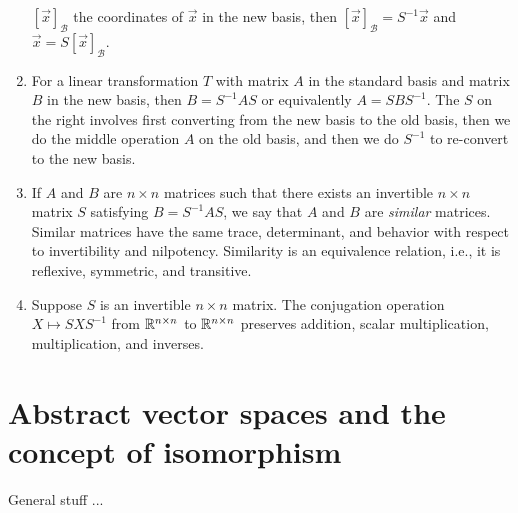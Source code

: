 \documentclass[10pt]{amsart}
\begin{document}
\begin{enumerate}
  $[\vec{x}]_{\mathcal{B}}$ the coordinates of $\vec{x}$ in the new
  basis, then $[\vec{x}]_{\mathcal{B}} = S^{-1}\vec{x}$ and $\vec{x} =
  S[\vec{x}]_{\mathcal{B}}$.
\item For a linear transformation $T$ with matrix $A$ in the standard
  basis and matrix $B$ in the new basis, then $B = S^{-1}AS$ or
  equivalently $A = SBS^{-1}$. The $S$ on the right involves first
  converting from the new basis to the old basis, then we do the
  middle operation $A$ on the old basis, and then we do $S^{-1}$ to
  re-convert to the new basis.
\item If $A$ and $B$ are $n \times n$ matrices such that there exists
  an invertible $n \times n$ matrix $S$ satisfying $B = S^{-1}AS$, we
  say that $A$ and $B$ are {\em similar} matrices. Similar matrices
  have the same trace, determinant, and behavior with respect to
  invertibility and nilpotency. Similarity is an equivalence relation,
  i.e., it is reflexive, symmetric, and transitive.
\item Suppose $S$ is an invertible $n \times n$ matrix. The
  conjugation operation $X \mapsto SXS^{-1}$ from $\mathbb{R}^{n \times n}$ to
  $\mathbb{R}^{n \times n}$ preserves addition, scalar multiplication,
  multiplication, and inverses.
\end{enumerate}

\section{Abstract vector spaces and the concept of isomorphism}

General stuff ...
\end{document}
